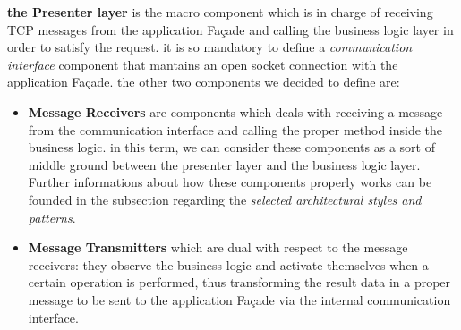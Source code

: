 \textbf{the Presenter layer}
        is the macro component which is in charge of receiving TCP messages from the application Façade and calling the business logic layer in order to satisfy the request. it is so mandatory to define a \emph{communication interface} component that mantains an open socket connection with the application Façade. the other two components we decided to define are:
        \begin{itemize}
            \item \textbf{Message Receivers} are components which deals with receiving a message from the communication interface and calling the proper method inside the business logic. in this term, we can consider these components as a sort of middle ground between the presenter layer and the business logic layer. Further informations about how these components properly works can be founded in the subsection regarding the \emph{selected architectural styles and patterns}.
            \item \textbf{Message Transmitters} which are dual with respect to the message receivers: they observe the business logic and activate themselves when a certain operation is performed, thus transforming the result data in a proper message to be sent to the application Façade via the internal communication interface.
        \end{itemize}
        
